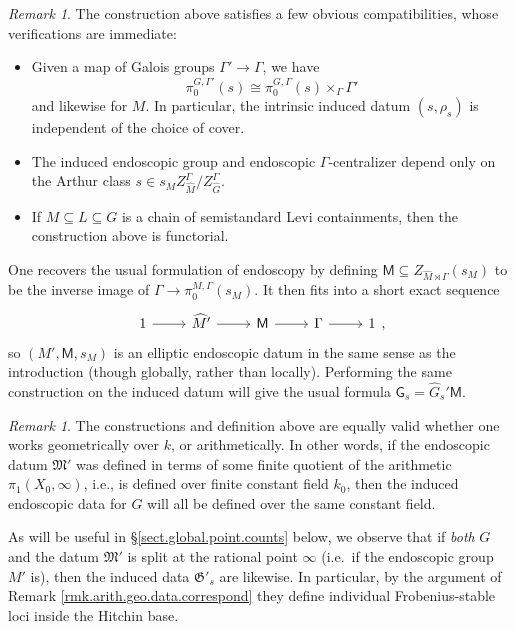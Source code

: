 \documentclass[openany]{amsbook}
\theoremstyle{definition}
\theoremstyle{remark}
\newtheorem{remark}[theorem]{Remark}
\numberwithin{equation}{section}
\newcommand{\eM}{\mathsf{M}}
\newcommand{\eG}{\mathsf{G}}
\renewcommand{\-}{\operatorname{-}}
\newcommand{\fM}{\mathfrak{M}}
\newcommand{\fG}{\mathfrak{G}}
\begin{document}
\begin{remark}\label{rmk.ind.endo.compatibilities}
    The construction above satisfies a few obvious compatibilities, whose verifications are immediate:
    \begin{itemize}
        \item Given a map of Galois groups $\Gamma' \to \Gamma$, we have
        $$
            \pi_0^{G, \Gamma'}(s) \cong \pi_0^{G, \Gamma}(s) \times_{\Gamma} \Gamma'
        $$
        and likewise for $M$. In particular, the intrinsic induced datum $(s, \rho_s)$ is independent of the choice of cover. 

        \item The induced endoscopic group and endoscopic $\Gamma$-centralizer depend only on the Arthur class $s \in s_M Z_{\widehat{M}}^\Gamma/Z_{\widehat{G}}^\Gamma$. 
        \item If $M \subseteq L \subseteq G$ is a chain of semistandard Levi containments, then the construction above is functorial. 
    \end{itemize}

    One recovers the usual formulation of endoscopy by defining $\eM \subseteq Z_{\widehat{M} \rtimes \Gamma}(s_M)$ to be the inverse image of $\Gamma \to \pi_0^{M,\Gamma}(s_M)$. It then fits into a short exact sequence
    $$
        \begin{tikzcd}
            1 \ar[r] & \widehat{M}' \ar[r] & \eM \ar[r] & \Gamma \ar[r] & 1
        \end{tikzcd},
    $$
    so $(M', \eM, s_M)$ is an elliptic endoscopic datum in the same sense as the introduction (though globally, rather than locally). Performing the same construction on the induced datum will give the usual formula $\eG_s = \widehat{G}_s' \eM$.
\end{remark}

\begin{remark}\label{rmk.ind.data.arithmetic}
The constructions and definition above are equally valid whether one works geometrically over $k$, or arithmetically. In other words, if the endoscopic datum $\fM'$ was defined in terms of some finite quotient of the arithmetic $\pi_1(X_0, \infty)$, i.e., is defined over finite constant field $k_0$, then the induced endoscopic data for $G$ will all be defined over the same constant field.

As will be useful in \S \ref{sect.global.point.counts} below, we observe that if \textit{both} $G$ and the datum $\fM'$ is split at the rational point $\infty$ (i.e.\ if the endoscopic group $M'$ is), then the induced data $\fG'_s$ are likewise. In particular, by the argument of Remark \ref{rmk.arith.geo.data.correspond} they define individual Frobenius-stable loci inside the Hitchin base.
\end{remark}
\end{document}
